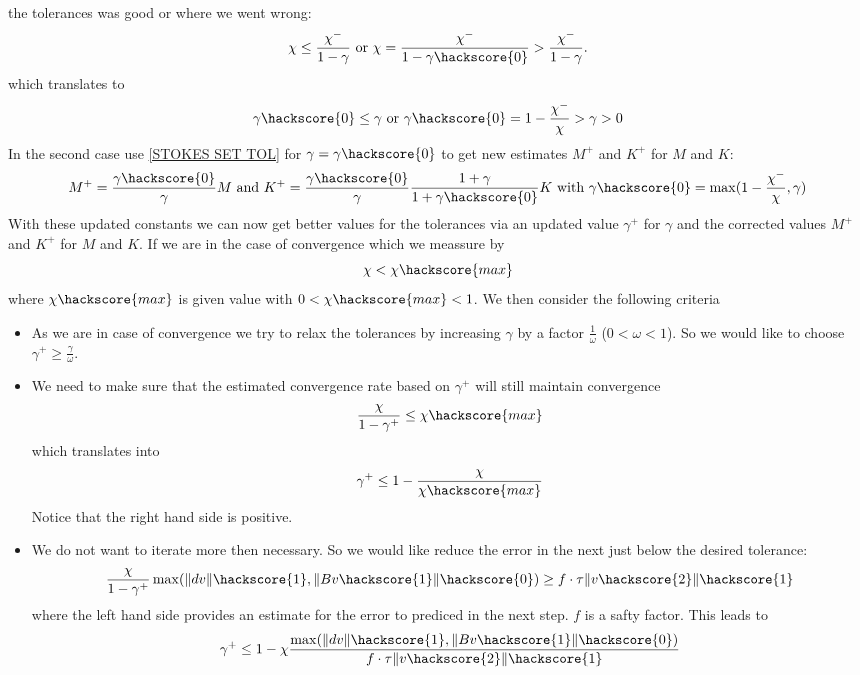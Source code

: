 the tolerances was good or where we went wrong:
\begin{equation} 
\chi \le \frac{\chi^{-}}{1-\gamma} \mbox{ or } 
\chi = \frac{\chi^{-}}{1-\gamma\hackscore{0}} >\frac{\chi^{-}}{1-\gamma}.
\end{equation}
which translates to 
\begin{equation} 
\gamma\hackscore{0} \le \gamma \mbox{ or } \gamma\hackscore{0}=1-\frac{\chi^{-}}{ \chi}>\gamma>0
\end{equation}
In the second case use \ref{STOKES SET TOL} for $\gamma=\gamma\hackscore{0}$ to get new estimates $M^{+}$ and $K^{+}$
for $M$ and $K$:
\begin{equation} \label{TOKES CONST UPDATE}
M^{+} = 
\frac{\gamma\hackscore{0}}{\gamma} M
\mbox{ and } K^{+} = 
\frac{\gamma\hackscore{0}}{\gamma}
\frac{1+\gamma}{1+\gamma\hackscore{0}}
K 
\mbox{ with } \gamma\hackscore{0}=\max(1-\frac{\chi^{-}}{ \chi},\gamma)
\end{equation}
With these updated constants we can now get better values for the tolerances via an updated value $\gamma^{+}$ for $\gamma$ and the corrected values $M^{+}$ and $K^{+}$ for $M$ and $K$. If we are in the case of convergence which we 
meassure by 
\begin{equation}
\chi < \chi\hackscore{max}
\end{equation}
where $\chi\hackscore{max}$ is given value with $0<\chi\hackscore{max}<1$. We then consider the following 
criteria
\begin{itemize}
 \item As we are in case of convergence we try to relax the tolerances by increasing $\gamma$ by a factor $\frac{1}{\omega}$ ($0<\omega<1$). So we would like to choose 
$\gamma^{+} \ge \frac{\gamma}{\omega}$.
\item We need to make sure that the estimated convergence rate based on $\gamma^{+}$ will still maintain convergence 
\begin{equation}
\frac{\chi}{1-\gamma^{+}} \le \chi\hackscore{max} 
\end{equation}
which translates into 
\begin{equation}
\gamma^{+} \le 1 - \frac{\chi}{\chi\hackscore{max}} 
\end{equation}
Notice that the right hand side is positive.
\item We do not want to iterate more then necessary. So we would like reduce the error in the next just below the 
desired tolerance:
\begin{equation}
\frac{\chi}{1-\gamma^{+}}\max(\|dv\|\hackscore{1}, \|Bv\hackscore{1}\|\hackscore{0}) \ge f \cdot \tau \|v\hackscore{2}\|\hackscore{1}
\end{equation}
where the left hand side provides an estimate for the error to prediced in the next step. $f$ is a 
safty factor. This leads to
\begin{equation}
\gamma^{+} \le
1 - 
\chi \frac{\max(\|dv\|\hackscore{1}, \|Bv\hackscore{1}\|\hackscore{0})} { f \cdot \tau \|v\hackscore{2}\|\hackscore{1}}
\end{equation}
\end{itemize}
